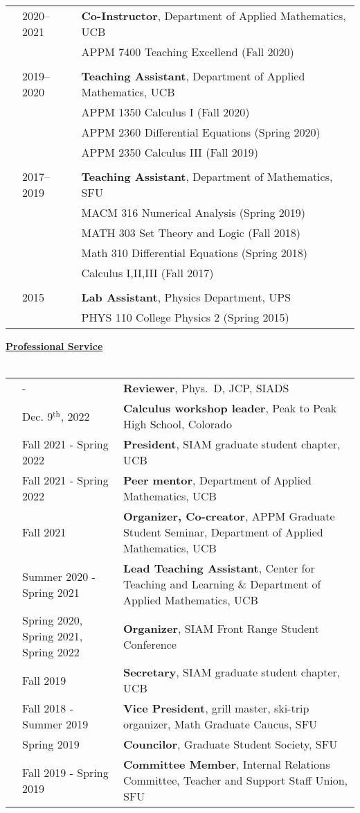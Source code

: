 \documentclass[letterpaper,11pt,oneside]{article}
\newcommand{\headr}[1]{\vspace{10pt}\uline{\Large{\textbf{#1}} \hfill } \\ \vspace{-10pt}\\}
\begin{document}
\begin{tabular}{@{} p{0.01cm} p{2cm} p{14cm}}
& 2020--2021 & \textbf{Co-Instructor}, Department of Applied Mathematics, UCB \\
&     & APPM 7400 Teaching Excellend (Fall 2020)\\
&&\\
& 2019-- 2020 & \textbf{Teaching Assistant}, Department of Applied Mathematics, UCB \\
&     & APPM 1350 Calculus I (Fall 2020)\\
&     & APPM 2360 Differential Equations (Spring 2020)\\
&     & APPM 2350 Calculus III (Fall 2019)\\
&&\\
& 2017--2019  & \textbf{Teaching Assistant}, Department of Mathematics, SFU  \\
&     & MACM 316 Numerical Analysis (Spring 2019) \\
&     & MATH 303 Set Theory and Logic (Fall 2018) \\ 
&     & Math 310 Differential Equations (Spring 2018) \\ 
&     & Calculus I,II,III (Fall 2017)\\
&&\\
& 2015  &\textbf{Lab Assistant}, Physics Department, UPS \\
&     & PHYS 110 College Physics 2 (Spring 2015) \\
\end{tabular}
\newpage
\headr{Professional Service}

\begin{tabular}{@{} p{0.01cm} p{4.5cm} p{12cm}}
& - & {\bf Reviewer}, Phys.\ D, JCP, SIADS\\
& Dec. 9$^\text{th}$, 2022 & {\bf Calculus workshop leader}, Peak to Peak High School, Colorado \\ 
& Fall 2021 - Spring 2022 & \textbf{President}, SIAM graduate student chapter, UCB\\
& Fall 2021 - Spring 2022  & \textbf{Peer mentor}, Department of Applied Mathematics, UCB\\
& Fall 2021  & \textbf{Organizer, Co-creator}, APPM Graduate Student Seminar, Department of Applied Mathematics, UCB\\
& Summer 2020 - Spring 2021 & \textbf{Lead Teaching Assistant}, Center for Teaching and Learning \& Department of Applied Mathematics, UCB\\
& Spring 2020, Spring 2021, Spring 2022  & \textbf{Organizer}, SIAM Front Range Student Conference \\
& Fall 2019  & \textbf{Secretary}, SIAM graduate student chapter, UCB\\
& Fall 2018 - Summer 2019 & \textbf{Vice President}, grill master, ski-trip organizer, Math Graduate Caucus, SFU\\
& Spring 2019 & \textbf{Councilor}, Graduate Student Society, SFU\\
& Fall 2019 - Spring 2019 & \textbf{Committee Member}, Internal Relations Committee, Teacher and Support Staff Union, SFU \\
\end{tabular}
\end{document}
